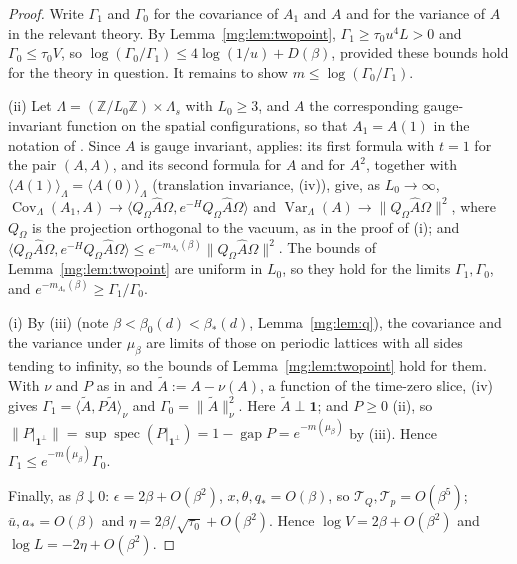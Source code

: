 \documentclass[11pt,a4paper]{article}
\theoremstyle{definition}
\theoremstyle{remark}
\DeclareMathOperator{\Cov}{Cov}
\DeclareMathOperator{\Var}{Var}
\DeclareMathOperator{\spec}{spec}
\DeclareMathOperator{\gap}{gap}
\newcommand{\ip}[2]{\langle #1,#2\rangle}
\newcommand{\Z}{\mathbb{Z}}
\newcommand{\norm}[1]{\lVert #1\rVert}
\newcommand{\Fref}[3]{\cite[#1~`#2' (\texttt{#3})]{F}}
\newcommand{\Flab}[2]{\cite[#1 \texttt{#2}]{F}}
\newcommand{\IIref}[3]{\cite[#1~`#2' (\texttt{#3})]{II}}
\newcommand{\IIlab}[2]{\cite[#1 \texttt{#2}]{II}}
\begin{document}
\begin{proof}
Write $\Gamma_1$ and $\Gamma_0$ for the covariance of $A_1$ and $A$ and for the variance of $A$ in the relevant theory. By
Lemma~\ref{mg:lem:twopoint}, $\Gamma_1\ge\tau_0u^4L>0$ and $\Gamma_0\le\tau_0V$, so $\log(\Gamma_0/\Gamma_1)\le4\log(1/u)+D(\beta)$,
provided these bounds hold for the theory in question. It remains to show $m\le\log(\Gamma_0/\Gamma_1)$.

(ii) Let $\Lambda=(\Z/L_0\Z)\times\Lambda_s$ with $L_0\ge3$, and $A$ the corresponding gauge-invariant function on the spatial
configurations, so that $A_1=A(1)$ in the notation of \Fref{Theorem}{Transfer matrix formalism}{thm:tm}. Since $A$ is gauge invariant,
\Fref{Theorem}{Ground-state expectations}{thm:gs} applies: its first formula with $t=1$ for the pair $(A,A)$, and its second formula for $A$
and for $A^2$, together with $\langle A(1)\rangle_\Lambda=\langle A(0)\rangle_\Lambda$ (translation invariance, \Flab{Theorem}{thm:basic}(iv)),
give, as $L_0\to\infty$, $\Cov_\Lambda(A_1,A)\to\ip{Q_\Omega\hat A\Omega}{e^{-H}Q_\Omega\hat A\Omega}$ and
$\Var_\Lambda(A)\to\norm{Q_\Omega\hat A\Omega}^2$, where $Q_\Omega$ is the projection orthogonal to the vacuum, as in the proof of
\Fref{Theorem}{Gap $\Leftrightarrow$ clustering in time}{thm:gapclust}(i); and $\ip{Q_\Omega\hat A\Omega}{e^{-H}Q_\Omega\hat A\Omega}\le
e^{-m_{\Lambda_s}(\beta)}\norm{Q_\Omega\hat A\Omega}^2$. The bounds of Lemma~\ref{mg:lem:twopoint} are uniform in $L_0$, so they hold for the limits
$\Gamma_1,\Gamma_0$, and $e^{-m_{\Lambda_s}(\beta)}\ge \Gamma_1/\Gamma_0$.

(i) By \IIref{Theorem}{Uniqueness and convergence}{iv:thm:unique}(iii) (note $\beta<\beta_0(d)<\beta_*(d)$, Lemma~\ref{mg:lem:q}), the
covariance and the variance under $\mu_\beta$ are limits of those on periodic lattices with all sides tending to infinity, so the bounds
of Lemma~\ref{mg:lem:twopoint} hold for them. With $\nu$ and $P$ as in \IIref{Corollary}{The time-slice chain}{iv:cor:chain} and
$\tilde A:=A-\nu(A)$, a function of the time-zero slice, \IIlab{Corollary}{iv:cor:chain}(iv) gives $\Gamma_1=\ip{\tilde A}{P\tilde A}_\nu$ and
$\Gamma_0=\norm{\tilde A}_\nu^2$. Here $\tilde A\perp\mathbf1$; and $P\ge0$ \IIref{Theorem}{Transfer operator, ground-state chain and mass
gap}{iv:thm:gap}(ii), so $\norm{P|_{\mathbf1^\perp}}=\sup\spec(P|_{\mathbf1^\perp})=1-\gap P=e^{-m(\mu_\beta)}$ by \IIlab{Theorem}{iv:thm:gap}(iii).
Hence $\Gamma_1\le e^{-m(\mu_\beta)}\Gamma_0$.

Finally, as $\beta\downarrow0$: $\epsilon=2\beta+O(\beta^2)$, $x,\theta,q_*=O(\beta)$, so $\mathcal T_Q,\mathcal T_p=O(\beta^5)$; $\bar u,a_*=O(\beta)$ and
$\eta=2\beta/\sqrt{\tau_0}+O(\beta^2)$. Hence $\log V=2\beta+O(\beta^2)$ and $\log L=-2\eta+O(\beta^2)$.
\end{proof}
\end{document}
